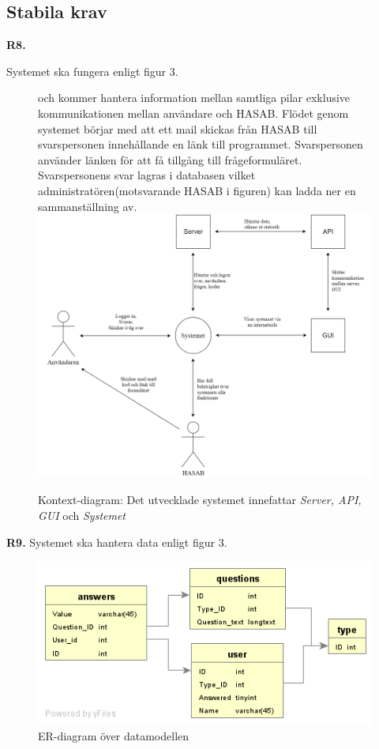 \documentclass{article}
\begin{document}
    \subsection{Stabila krav}
    \noindent \large{\textbf{R8.}}
    \normalsize{Systemet ska fungera enligt figur 3.
    
    \begin{figure}[h!]
    \caption{Kontext-diagram: Det utvecklade systemet innefattar \textit{Server, API, GUI} och \textit{Systemet}} och kommer hantera information mellan samtliga pilar exklusive kommunikationen mellan användare och HASAB. Flödet genom systemet börjar med att ett mail skickas från HASAB till svarspersonen innehållande en länk till programmet. Svarspersonen använder länken för att få tillgång till frågeformuläret. Svarspersonens svar lagras i databasen vilket administratören(motsvarande HASAB i figuren) kan ladda ner en sammanställning av.\\
    
    \includegraphics[width=150mm]{Kontextdiagram.png}
    
    \end{figure}
}
    \newpage
    \noindent \large{\textbf{R9.}}
    Systemet ska hantera data enligt figur 3.
       \begin{figure}[h!]
    
    \includegraphics[width=150mm]{er.png}
    \caption{ER-diagram över datamodellen}
    \end{figure}
    
\end{document}
